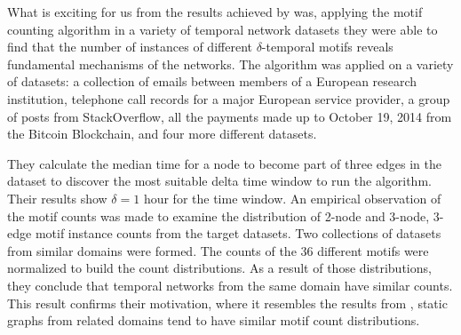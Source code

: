 \documentclass[../../thesis.tex]{subfiles}
\begin{document}
What is exciting for us from the results achieved by \cite{temporalMotifs} was, applying the motif counting algorithm in a variety of temporal network datasets they were able to find that the number of instances of different $\delta$-temporal motifs reveals fundamental mechanisms of the networks. The algorithm was applied on a variety of datasets: a collection of emails between members of a European research institution, telephone call records for a major European service provider, a group of posts from StackOverflow, all the payments made up to October 19, 2014 from the Bitcoin Blockchain, and four more different datasets. 

They calculate the median time for a node to become part of three edges in the dataset to discover the most suitable delta time window to run the algorithm. Their results show $\delta=1$ hour for the time window. An empirical observation of the motif counts was made to examine the distribution of 2-node and 3-node, 3-edge motif instance counts from the target datasets. Two collections of datasets from similar domains were formed. The counts of the 36 different motifs were normalized to build the count distributions. As a result of those distributions, they conclude that temporal networks from the same domain have similar counts. This result confirms their motivation, where it resembles the results from \cite{milo2004superfamilies_18, vazquez2004topological_25, yaverouglu2014revealing_29}, static graphs from related domains tend to have similar motif count distributions.
\end{document}
